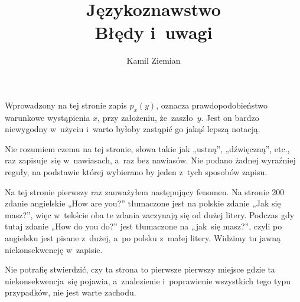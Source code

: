 \documentclass[a4paper,11pt]{article}
\title{Językoznawstwo \\
  {\Large Błędy i~uwagi}}
\author{Kamil Ziemian}
\begin{document}





\maketitle %






\vspace{0em}



\vspace{0em}


 Wprowadzony na tej stronie zapis $p_{ x }( y )$, oznacza
prawdopodobieństwo warunkowe wystąpienia $x$, przy założeniu, że~zaszło~$y$.
Jest on bardzo niewygodny w~użyciu i~warto byłoby zastąpić go jakąś lepszą
notacją.

\vspace{\spaceFour}





 Nie rozumiem czemu na tej stronie, słowa takie jak „ustną”,
„dźwięczną”, etc., raz zapisuje~się w~nawiasach, a~raz bez nawiasów. Nie
podano żadnej wyraźniej reguły, na podstawie której wybierano by jeden z~tych
sposobów zapisu.

\vspace{\spaceFour}





 Na tej stronie pierwszy raz zauważyłem następujący fenomen.
Na stronie 200 zdanie angielskie „How are you?” tłumaczone jest na polskie
zdanie „Jak się masz?”, więc w~tekście oba te zdania zaczynają się od dużej
litery. Podczas gdy tutaj zdanie „How do you do?” jest tłumaczone na
„jak~się masz?”, czyli po angielsku jest pisane z~dużej, a~po polsku z~małej
litery. Widzimy tu jawną niekonsekwencję w~zapisie.

Nie potrafię stwierdzić, czy ta strona to pierwsze pierwszy miejsce gdzie ta
niekonsekwencja~się pojawia, a~znalezienie i~poprawienie wszystkich tego
typu przypadków, nie jest warte zachodu.
\end{document}
